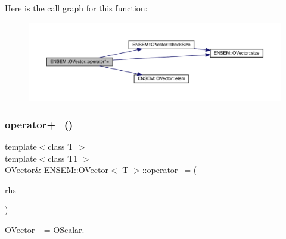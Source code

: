 Here is the call graph for this function\+:
\nopagebreak
\begin{figure}[H]
\begin{center}
\leavevmode
\includegraphics[width=350pt]{d0/d8d/classENSEM_1_1OVector_ab1d7773b4a23e20961ece98c90b915b4_cgraph}
\end{center}
\end{figure}
\mbox{\label{classENSEM_1_1OVector_a6cb710cbb29083f2849c48da65292174}} 
\subsubsection{\texorpdfstring{operator+=()}{operator+=()}\hspace{0.1cm}{\footnotesize\ttfamily [1/6]}}
{\footnotesize\ttfamily template$<$class T $>$ \\
template$<$class T1 $>$ \\
\mbox{\hyperlink{classENSEM_1_1OVector}{O\+Vector}}\& \mbox{\hyperlink{classENSEM_1_1OVector}{E\+N\+S\+E\+M\+::\+O\+Vector}}$<$ T $>$\+::operator+= (\begin{DoxyParamCaption}\item[{const \mbox{\hyperlink{classENSEM_1_1OScalar}{O\+Scalar}}$<$ T1 $>$ \&}]{rhs }\end{DoxyParamCaption})\hspace{0.3cm}{\ttfamily [inline]}}



\mbox{\hyperlink{classENSEM_1_1OVector}{O\+Vector}} += \mbox{\hyperlink{classENSEM_1_1OScalar}{O\+Scalar}}. 

